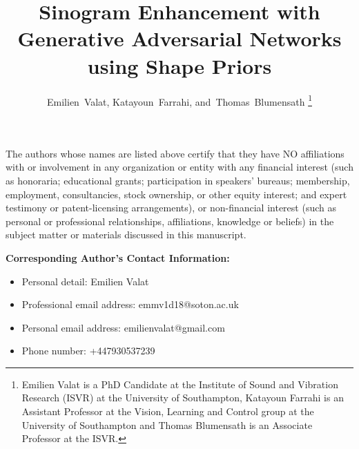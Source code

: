 \documentclass{article}
\title{Sinogram Enhancement with Generative Adversarial Networks using Shape Priors}
\author{Emilien~Valat,
        Katayoun~Farrahi,
        and~Thomas~Blumensath%
\thanks{
Emilien Valat is a PhD Candidate at the Institute of Sound and Vibration Research (ISVR) at the University of Southampton, Katayoun Farrahi is an Assistant Professor at the Vision, Learning and Control group at the University of Southampton and Thomas Blumensath is an Associate Professor at the ISVR.}
}
\begin{document}
\begin{titlepage}
\maketitle

The authors whose names are listed above certify that they have NO affiliations with or involvement in any organization or entity with any financial interest (such as honoraria; educational grants; participation in speakers’ bureaus; 
membership, employment, consultancies, stock ownership, or other equity interest; and expert testimony or patent-licensing arrangements), or non-financial interest (such as personal or professional relationships, affiliations, knowledge or beliefs) in 
the subject matter or materials discussed in this manuscript.

\vspace{1em}

\textbf{Corresponding Author's Contact Information:}
\begin{itemize}
	\item Personal detail: Emilien Valat 
	\item Professional email address: emmv1d18@soton.ac.uk
	\item Personal email address: emilienvalat@gmail.com
	\item Phone number: +447930537239
\end{itemize}



\end{titlepage}
\end{document}
